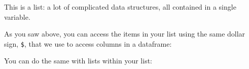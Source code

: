 \documentclass[
]{book}
\newenvironment{Shaded}{\begin{snugshade}}{\end{snugshade}}
\newcommand{\DecValTok}[1]{\textcolor[rgb]{0.00,0.00,0.81}{#1}}
\newcommand{\NormalTok}[1]{#1}
\newcommand{\OperatorTok}[1]{\textcolor[rgb]{0.81,0.36,0.00}{\textbf{#1}}}
\begin{document}
\begin{Shaded}
\end{Shaded}

This is a list: a lot of complicated data structures, all contained in a single variable.

As you saw above, you can access the items in your list using the same dollar sign, \texttt{\$}, that we use to access columns in a dataframe:

\begin{Shaded}
\end{Shaded}

You can do the same with lists within your list:

\begin{Shaded}
\end{Shaded}
\end{document}
